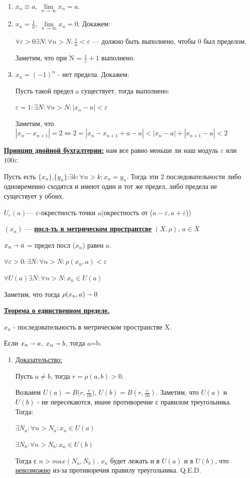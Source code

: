 \documentclass{article}
\newcommand{\deff}[1]{\underline{\textbf{#1}}}
\newcommand{\thmm}[1]{\underline{\textbf{#1}}}
\begin{document}
\begin{enumerate}
    \item $x_n \equiv a$, $\lim\limits_{n\to \infty}x_n =a$. 

    \item $x_n = \frac{1}{n}$, $\lim\limits_{n\to \infty}x_n =0$. Докажем:

    
$\forall \varepsilon > 0 \exists N: \forall n> N: \frac{1}{n} < \varepsilon$ --- должно быть выполнено, чтобы 0 был пределом.

Заметим, что при N = $\frac{1}{\varepsilon} +1$ выполнено.

    \item $x_n = (-1)^n$ - нет предела. Докажем:
    
Пусть такой предел a существует, тогда выполнено:

$\varepsilon = 1: \exists N: \forall n > N: |x_n-a|<\varepsilon$

Заметим, что $|x_n-x_{n+1}| =2 \Leftrightarrow 2 = |x_n-x_{n+1} +a - a| <|x_n-a| +|x_{n+1}-a| < 2$ 
\end{enumerate}


\deff{Принцип двойной бухгалтерии:} нам все равно меньше ли наш модуль $\varepsilon$ или $100\varepsilon$.

Пусть есть $\{x_n\}$,$\{y_n\}$:$\exists k: \forall n>k: x_n=y_n$. Тогда эти 2 последовательности либо одновременно сходятся и имеют один и тот же предел, либо предела не существует  у обоих.

$U_{\varepsilon}(a)$--- $\varepsilon$-окрестность точки a(окрестность от ($a-\varepsilon, a+\varepsilon$))

$(x_n)$ --- \deff{посл-ть в метрическом пространтсве} $(X, \rho)$, $a \in X$

$x_n \shortrightarrow a$ =  предел посл ($x_n$) равен $a$.

$\forall \varepsilon > 0: \exists N: \forall n>N:\rho(x_n,a)<\varepsilon$

$\forall U(a) \exists N: \forall n>N: x_n \in U(a)$

Заметим, что тогда $\rho (x_n,a) \shortrightarrow 0$

\thmm{Теорема о единственном пределе.}

 $x_n$ - последовательность в метрическом пространстве X. 

Если $x_n \shortrightarrow a$, $x_n \shortrightarrow b$, тогда a=b.

\begin{enumerate}
\item[] \uline{Доказательство:}

Пусть $a \neq b$, тогда $r= \rho(a,b)>0$.

Возьмем $U(a)=B(r,\frac{r}{10}$), $U(b)=B(r,\frac{r}{10})$. Заметим, что $U(a)$ и $U(b)$ - не пересекаются, иначе противоречие с правилом треугольника. Тогда:


$\exists N_a : \forall n> N_a: x_n \in U(a)$

$\exists N_b : \forall n> N_b: x_n \in U(b)$

Тогда с $n > max(N_a,N_b)$. $x_n$ будет лежать и в $U(a)$ и в $U(b)$, что \uline{невозможно} из-за противоречия правилу треугольника. Q.E.D.
\end{enumerate}
\end{document}
